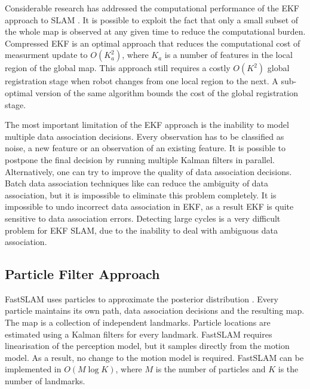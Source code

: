 Considerable research has addressed the computational performance of
the EKF approach to SLAM \cite{williams:acra2001, williams2001esa,
  knight2001tct, guivant01, tim_bailey, uhlmann97nondivergent,
  tardos02:_mappin_local_indoor_envir_using_sonar_data}.  It is
possible to exploit the fact that only a small subset of the whole map
is observed at any given time to reduce the computational burden.
Compressed EKF \cite{williams:acra2001} is an optimal approach that
reduces the computational cost of measurment update to $O(K_a^2)$,
where $K_a$ is a number of features in the local region of the global
map.  This approach still requires a costly $O(K^2)$ global
registration stage when robot changes from one local region to the
next. A sub-optimal version of the same algorithm bounds the cost of the
global registration stage.


The most important limitation of the EKF approach is the inability to
model multiple data association decisions. Every observation has to be
classified as noise, a new feature or an observation of an existing
feature.  It is possible to postpone the final decision by running
multiple Kalman filters in parallel. Alternatively, one can try to
improve the quality of data association decisions. Batch data
association techniques like
\cite{neira01:_data_assoc_stoch_mappin_using,
tardos02:_mappin_local_indoor_envir_using_sonar_data} can reduce the
ambiguity of data association, but it is impossible to eliminate this
problem completely. It is impossible to undo incorrect data association
in EKF, as a result EKF is quite sensitive to data association
errors. Detecting large cycles is a very difficult problem for EKF SLAM,
due to the inability to deal with ambiguous data association.


\subsection{Particle Filter Approach}
FastSLAM uses particles to approximate the posterior distribution
\cite{fastslam}. Every particle maintains its own path, data
association decisions and the resulting map. The map is a collection
of independent landmarks. Particle locations are estimated using a
Kalman filters for every landmark. FastSLAM requires linearisation of
the perception model, but it samples directly from the motion model.
As a result, no change to the motion model is required. FastSLAM can
be implemented in $O(M\log K)$, where $M$ is the number of particles
and $K$ is the number of landmarks.

